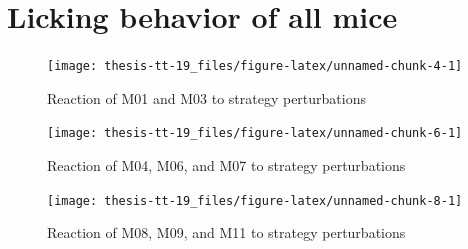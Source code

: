 \documentclass[]{report}
\theoremstyle{definition}
\theoremstyle{definition}
\theoremstyle{definition}
\theoremstyle{remark}
\begin{document}
\hypertarget{licking-behavior-of-all-mice}{%
\chapter{Licking behavior of all
mice}\label{licking-behavior-of-all-mice}}

\begin{figure}

{\centering \texttt{[image: thesis-tt-19\_files/figure-latex/unnamed-chunk-4-1]} 

}

\caption{Reaction of M01 and M03 to strategy perturbations}\label{fig:unnamed-chunk-4}
\end{figure}







\begin{figure}

{\centering \texttt{[image: thesis-tt-19\_files/figure-latex/unnamed-chunk-6-1]} 

}

\caption{Reaction of M04, M06, and M07 to strategy perturbations}\label{fig:unnamed-chunk-6}
\end{figure}





\begin{figure}

{\centering \texttt{[image: thesis-tt-19\_files/figure-latex/unnamed-chunk-8-1]} 

}

\caption{Reaction of M08, M09, and M11 to strategy perturbations}\label{fig:unnamed-chunk-8}
\end{figure}






\end{document}
